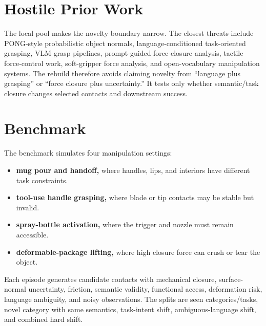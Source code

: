 \documentclass{article}
\begin{document}
\section{Hostile Prior Work}
The local pool makes the novelty boundary narrow. The closest threats include PONG-style probabilistic object normals, language-conditioned task-oriented grasping, VLM grasp pipelines, prompt-guided force-closure analysis, tactile force-control work, soft-gripper force analysis, and open-vocabulary manipulation systems. The rebuild therefore avoids claiming novelty from ``language plus grasping'' or ``force closure plus uncertainty.'' It tests only whether semantic/task closure changes selected contacts and downstream success.

\section{Benchmark}
The benchmark simulates four manipulation settings:
\begin{itemize}
\item \textbf{mug pour and handoff,} where handles, lips, and interiors have different task constraints.
\item \textbf{tool-use handle grasping,} where blade or tip contacts may be stable but invalid.
\item \textbf{spray-bottle activation,} where the trigger and nozzle must remain accessible.
\item \textbf{deformable-package lifting,} where high closure force can crush or tear the object.
\end{itemize}
Each episode generates candidate contacts with mechanical closure, surface-normal uncertainty, friction, semantic validity, functional access, deformation risk, language ambiguity, and noisy observations. The splits are seen categories/tasks, novel category with same semantics, task-intent shift, ambiguous-language shift, and combined hard shift.
\end{document}

